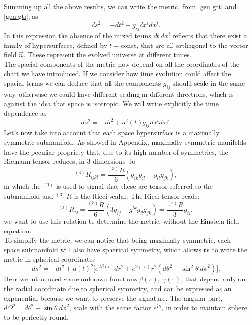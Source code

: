 Summing up all the above results, we can write the metric, from \eqref{gen gtt} and \eqref{gen gti}, as
\begin{equation*}
    ds^2=-dt^2+g_{ij}dx^i dx^j.
\end{equation*}
In this expression the absence of the mixed terms $dt\ dx^i$ reflects that there exist a family of hypersurfaces, defined by $t=$const, that are all orthogonal to the vector field $\vec n$. These represent the evolved universe at different times.\\
The spacial components of the metric now depend on all the coordinates of the chart we have introduced. If we consider how time evolution could affect the spacial terms we can deduce that all the components $g_{ij}$ should scale in the same way, otherwise we could have different scaling in different directions, which is against the idea that space is isotropic. We will write explicitly the time dependence as
\begin{equation*}
    ds^2=-dt^2+a^2(t)g_{ij}dx^i dx^j.
\end{equation*} 
Let's now take into account that each space hypersurface is a maximally symmetric submanifold. 
As showed in Appendix, maximally symmetric manifolds have the peculiar propriety that, due to its high number of symmetries, the Riemann tensor reduces, in 3 dimensions, to 
\begin{equation}
    ^{(3)}R_{ijkl}=\frac{^{(3)}R}{6}(g_{ik}g_{jl}-g_{il}g_{jk}),
\end{equation}
in which the $^{(3)}$ is used to signal that these are tensor referred to the submanifold and $^{(3)}R$ is the Ricci scalar. The Ricci tensor reads:
\begin{equation}\label{maxsymRicci}
    ^{(3)}R_{ij}=\frac{^{(3)}R}{6}(3g_{ij}-g^{lk}g_{il}g_{jk})=\frac{^{(3)}R}{3}g_{ij},
\end{equation}
we want to use this relation to determine the metric, without the Einstein field equation.\\
To simplify the metric, we can notice that being maximally symmetric, each space submanifold will also have spherical symmetry, which allows us to write the metric in spherical coordinates
\begin{equation}
    ds^2=-dt^2+a(t)^2\big[e^{2\beta(r)}dr^2+e^{2\gamma(r)}r^2(d\theta^2+\sin^2\theta\ d\phi^2)\big].
\end{equation}  
Here we introduced some unknown functions $\beta(r),\ \gamma(r)$, that depend only on the radial coordinate due to spherical symmetry, and can be expressed as an exponential because we want to preserve the signature. The angular part, $d\Omega^2= d\theta^2+\sin\theta\ d\phi^2$, scale with the same factor $e^{2\gamma}$, in order to maintain sphere to be perfectly round.\\
